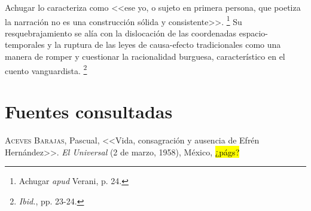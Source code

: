 \documentclass[14pt,twoside,final]{extbook} %
\let\oldfootnote\footnote
\renewcommand\footnote[1]{%
\oldfootnote{\hspace{1mm}#1}}
\begin{document}
Achugar lo caracteriza como <<ese yo, o sujeto en primera persona, que poetiza la narración no es una construcción sólida y consistente>>.\footnote{Achugar \emph{apud} Verani, p. 24.} Su resquebrajamiento se alía con la dislocación de las coordenadas espacio-temporales y la ruptura de las leyes de causa-efecto tradicionales como una manera de romper y cuestionar la racionalidad burguesa, característico en el cuento vanguardista.\footnote{\emph{Ibid.}, pp. 23-24.}
\newpage
\pagestyle{empty}
\null\vfill
\newpage
\pagestyle{empty}
\null\vfill
\chapter*{Fuentes consultadas}\label{ch:fuentes-consultadas}
\thispagestyle{empty}
\pagestyle{fancy}
\fancyhf{} %
\fancyhead[RO,LE]{\thepage}
\renewcommand{\headrulewidth}{0pt}
\setcounter{page}{37}
\textsc{Aceves Barajas}, Pascual, <<Vida, consagración y ausencia de Efrén Hernández>>. \emph{El Universal} (2 de marzo, 1958), México, \hl{¿págs?} \label{bib:aceves1958}
\end{document}

